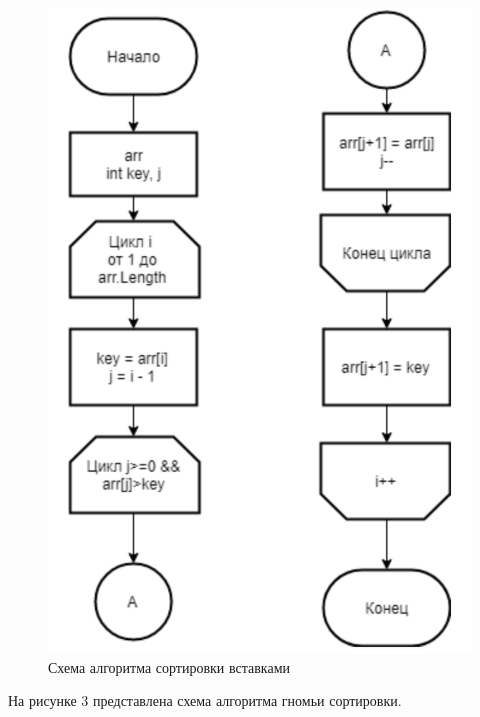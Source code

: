 \documentclass[a4paper, 12pt]{article}
\begin{document}
\begin{flushleft}
\begin{figure}[h]
		\centering \includegraphics[scale=0.9]{insert_graph}
		\centering \caption{Схема алгоритма сортировки вставками}
	\end{figure}
    \clearpage
	\newpage
	\hspace*{5mm} На рисунке 3 представлена схема алгоритма гномьи сортировки.
	\begin{figure}[h!]

\end{figure}
\end{flushleft}
\end{document}
